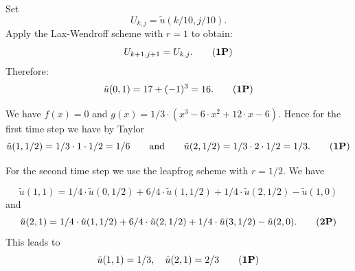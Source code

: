 \begin{loesung}
\begin{teilaufgaben}
\item
Set
\[
U_{k,j} = \tilde u(k/10, j/10).
\]
Apply the Lax-Wendroff scheme with $r = 1$ to obtain:
\begin{equation}
U_{k+1,j+1} = U_{k,j}.
\tag{\textbf{1P}}
\end{equation}
Therefore:
\begin{equation}
\tilde u(0,1) = 17 + (-1)^3 = 16.
\tag{\textbf{1P}}
\end{equation}

\item
We have $f(x) = 0$ and $g(x) = 1/3 \cdot (x^3 - 6 \cdot x^2 + 12 \cdot x - 6)$.
Hence for the first time step we have by Taylor
\begin{equation}
\tilde u(1, 1/2)
=
1/3 \cdot 1 \cdot 1/2 = 1/6
\qquad
\text{and}
\qquad
\tilde u(2, 1/2) = 1/3 \cdot 2 \cdot 1/2 = 1/3.
\tag{\textbf{1P}}
\end{equation}

For the second time step we use the leapfrog scheme with $r = 1/2$. We have
 
\[
\tilde u(1, 1)
=
1/4 \cdot \tilde u(0, 1/2) + 6/4 \cdot \tilde u(1,1/2) + 1/4
\cdot 
\tilde u(2, 1/2) - \tilde u(1,0) 
\]
and
\begin{equation}
\tilde u(2, 1)
=
1/4 \cdot \tilde u(1, 1/2)
+
6/4 \cdot \tilde u(2,1/2)
+
1/4 \cdot  \tilde u(3, 1/2)
-
\tilde u(2,0).
\tag{\textbf{2P}}
\end{equation}
This leads to
\begin{equation}
\tilde u(1, 1) = 1/3, \quad \tilde u(2, 1) = 2/3
\tag{\textbf{1P}}
\end{equation}

\end{teilaufgaben}
\end{loesung}


